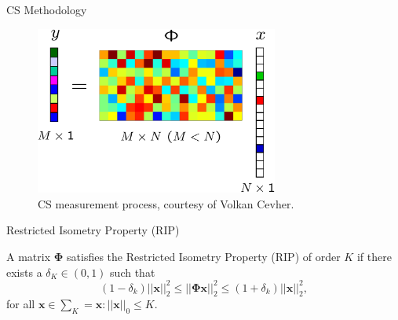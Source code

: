 \documentclass{beamer}
\begin{document}
\begin{frame}{CS Methodology}

\begin{figure}[h]
        \centering
        \includegraphics[width = 8cm]{csss}
        \caption{CS measurement process, courtesy of Volkan Cevher.}
      \end{figure}


\end{frame}

\begin{frame}{Restricted Isometry Property (RIP)}

  A matrix $\pmb{\Phi}$ satisfies the Restricted Isometry Property (RIP) of order $K$ if there exists a $\delta_K  \in (0,1)$ such that 
\begin{equation}
  \label{eq:4}
  (1 - \delta_k)||\pmb{x}||^2_2 \leq||\pmb{\Phi} \pmb{x}||^2_2 \leq (1 + \delta_k)||\pmb{x}||^2_2,
\end{equation}
for all $\pmb{x} \in \sum_K = {\pmb{x}:||\pmb{x}||_0 \leq K} $.
 
\end{frame}
\end{document}
